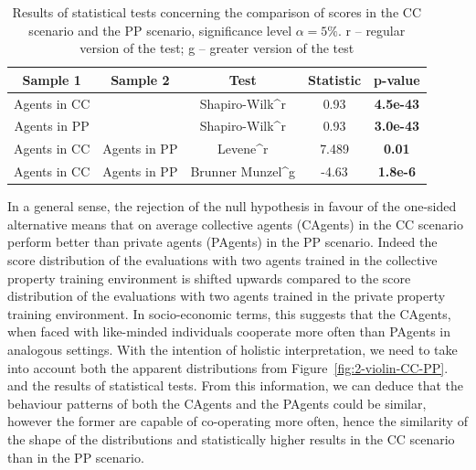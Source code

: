 \documentclass[preprint,12pt,authoryear]{elsarticle}
\begin{document}
\begin{table}[h!]
\begin{tabularx}{\textwidth}{ccccc}
\toprule
Sample 1      & Sample 2      & Test                        & Statistic & p-value   \\ \midrule
Agents in CC &               & Shapiro-Wilk^r            & 0.93      & \textbf{4.5e-43}   \\
Agents in PP &               & Shapiro-Wilk^r            & 0.93      & \textbf{3.0e-43}   \\
Agents in CC & Agents in PP & Levene^r                   & 7.489     & \textbf{0.01}       \\
Agents in CC & Agents in PP & Brunner Munzel^g          & -4.63     & \textbf{1.8e-6}   \\ \bottomrule
\end{tabularx}

\caption{Results of statistical tests concerning the comparison of scores in the CC scenario and the PP scenario, significance level $\alpha=5\%$. r -- regular version of the test; g -- greater version of the test}
\label{table:score-homo}
\end{table}


In a general sense, the rejection of the null hypothesis in favour of the one-sided alternative means that on average collective agents (CAgents) in the CC scenario perform better than private agents (PAgents) in the PP scenario. Indeed the score distribution of the evaluations with two agents trained in the collective property training environment is shifted upwards compared to the score distribution of the evaluations with two agents trained in the private property training environment. In socio-economic terms, this suggests that the CAgents, when faced with like-minded individuals cooperate more often than PAgents in analogous settings. With the intention of holistic interpretation, we need to take into account both the apparent distributions from Figure~\ref{fig:2-violin-CC-PP}. and the results of statistical tests. From this information, we can deduce that the behaviour patterns of both the CAgents and the PAgents could be similar, however the former are capable of co-operating more often, hence the similarity of the shape of the distributions and statistically higher results in the CC scenario than in the PP scenario.
\end{document}
